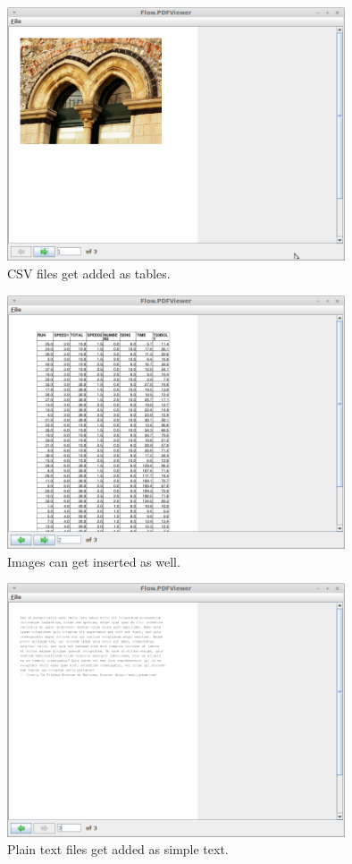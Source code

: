 \documentclass[a4paper]{book}
\begin{document}
\begin{figure}[htb]
  \centering
  \includegraphics[width=10.0cm]{images/pdf-create-output1.png}
  \caption{CSV files get added as tables.}
  \label{pdf-create-output1}
\end{figure}

\begin{figure}[htb]
  \centering
  \includegraphics[width=10.0cm]{images/pdf-create-output2.png}
  \caption{Images can get inserted as well.}
  \label{pdf-create-output2}
\end{figure}

\begin{figure}[htb]
  \centering
  \includegraphics[width=10.0cm]{images/pdf-create-output3.png}
  \caption{Plain text files get added as simple text.}
  \label{pdf-create-output3}
\end{figure}
\end{document}
